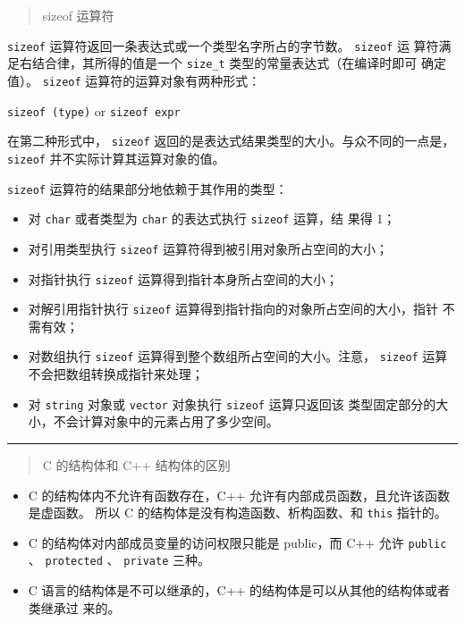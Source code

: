 \begin{quotation}
  {\color{red}sizeof 运算符}
\end{quotation}

\verb|sizeof| 运算符返回一条表达式或一个类型名字所占的字节数。 \verb|sizeof| 运
算符满足右结合律，其所得的值是一个 \verb|size_t| 类型的常量表达式（在编译时即可
确定值）。 \verb|sizeof| 运算符的运算对象有两种形式：

\qquad \verb|sizeof (type)| \quad or \quad \verb|sizeof expr|

在第二种形式中， \verb|sizeof| 返回的是表达式结果类型的大小。与众不同的一点是，
\verb|sizeof| 并不实际计算其运算对象的值。

\verb|sizeof| 运算符的结果部分地依赖于其作用的类型：
\begin{itemize}
\item 对 \verb|char| 或者类型为 \verb|char| 的表达式执行 \verb|sizeof| 运算，结
  果得 1；
\item 对引用类型执行 \verb|sizeof| 运算符得到被引用对象所占空间的大小；
\item 对指针执行 \verb|sizeof| 运算得到指针本身所占空间的大小；
\item 对解引用指针执行 \verb|sizeof| 运算得到指针指向的对象所占空间的大小，指针
  不需有效；
\item 对数组执行 \verb|sizeof| 运算得到整个数组所占空间的大小。注意，
  \verb|sizeof| 运算不会把数组转换成指针来处理；
\item 对 \verb|string| 对象或 \verb|vector| 对象执行 \verb|sizeof| 运算只返回该
  类型固定部分的大小，不会计算对象中的元素占用了多少空间。
\end{itemize}


\noindent\rule[0.25\baselineskip]{\textwidth}{1pt}

\begin{quotation}
  {\color{red}C 的结构体和 C++ 结构体的区别}
\end{quotation}

\begin{itemize}
\item C 的结构体内不允许有函数存在，C++ 允许有内部成员函数，且允许该函数是虚函数。
  所以 C 的结构体是没有构造函数、析构函数、和 \verb|this| 指针的。
\item C 的结构体对内部成员变量的访问权限只能是 public，而 C++ 允许
  \verb|public| 、 \verb|protected| 、 \verb|private| 三种。
\item C 语言的结构体是不可以继承的，C++ 的结构体是可以从其他的结构体或者类继承过
  来的。
\end{itemize}

